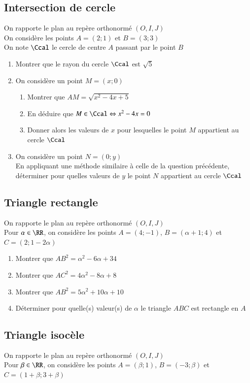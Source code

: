 \documentclass[oneside,12pt]{article}          %
\begin{document}
\subsection{Intersection de cercle}
On rapporte le plan au repère orthonormé $(O,I,J)$\\
On considère les points $A=(2;1)$ et $B=(3;3)$ \\
On note $\Ccal$ le cercle de centre $A$ passant par le point $B$
\begin{enumerate}
	\item Montrer que le rayon du cercle $\Ccal$ est $\sqrt{5}$
	\item On considère un point $M=(x;0)$
	\begin{enumerate}
		\item Montrer que $AM=\sqrt{x^2-4x+5}$
		\item En déduire que $M\in\Ccal \Leftrightarrow x^2-4x=0$
		\item Donner alors les valeurs de $x$ pour lesquelles le point $M$ appartient au cercle $\Ccal$
	\end{enumerate}
	\item On considère un point $N=(0;y)$ \\
	En appliquant une méthode similaire à celle de la question précédente, déterminer pour quelles valeurs de $y$ le point $N$ appartient au cercle $\Ccal$
\end{enumerate}



\subsection{Triangle rectangle}
On rapporte le plan au repère orthonormé $(O,I,J)$\\
Pour $\alpha\in\RR$, on considère les points $A=(4;-1)$, $B=(\alpha+1;4)$ et $C=(2;1-2\alpha)$
\begin{enumerate}
	\item Montrer que $AB^2=\alpha^2-6\alpha+34$
	\item Montrer que $AC^2=4\alpha^2-8\alpha+8$
	\item Montrer que $AB^2=5\alpha^2+10\alpha+10$
	\item Déterminer pour quelle(s) valeur(s) de $\alpha$ le triangle $ABC$ est rectangle en $A$
\end{enumerate}



\subsection{Triangle isocèle}
On rapporte le plan au repère orthonormé $(O,I,J)$\\
Pour $\beta\in\RR$, on considère les points $A=(\beta;1)$, $B=(-3;\beta)$ et $C=(1+\beta;3+\beta)$
\end{document}
